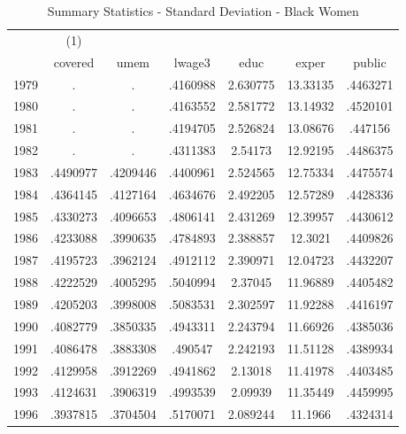 {
\def\sym#1{\ifmmode^{#1}\else\(^{#1}\)\fi}
\begin{longtable}{l*{1}{cccccc}}
\caption{Summary Statistics - Standard Deviation - Black Women}\\
\hline\hline\endfirsthead\hline\endhead\hline\endfoot\endlastfoot
            &\multicolumn{1}{c}{(1)}&            &            &            &            &            \\
            &     covered&        umem&      lwage3&        educ&       exper&      public\\
\hline
1979        &           .&           .&    .4160988&    2.630775&    13.33135&    .4463271\\
1980        &           .&           .&    .4163552&    2.581772&    13.14932&    .4520101\\
1981        &           .&           .&    .4194705&    2.526824&    13.08676&     .447156\\
1982        &           .&           .&    .4311383&     2.54173&    12.92195&    .4486375\\
1983        &    .4490977&    .4209446&    .4400961&    2.524565&    12.75334&    .4475574\\
1984        &    .4364145&    .4127164&    .4634676&    2.492205&    12.57289&    .4428336\\
1985        &    .4330273&    .4096653&    .4806141&    2.431269&    12.39957&    .4430612\\
1986        &    .4233088&    .3990635&    .4784893&    2.388857&     12.3021&    .4409826\\
1987        &    .4195723&    .3962124&    .4912112&    2.390971&    12.04723&    .4432207\\
1988        &    .4222529&    .4005295&    .5040994&     2.37045&    11.96889&    .4405482\\
1989        &    .4205203&    .3998008&    .5083531&    2.302597&    11.92288&    .4416197\\
1990        &    .4082779&    .3850335&    .4943311&    2.243794&    11.66926&    .4385036\\
1991        &    .4086478&    .3883308&     .490547&    2.242193&    11.51128&    .4389934\\
1992        &    .4129958&    .3912269&    .4941862&     2.13018&    11.41978&    .4403485\\
1993        &    .4124631&    .3906319&    .4993539&     2.09939&    11.35449&    .4459995\\
1996        &    .3937815&    .3704504&    .5170071&    2.089244&     11.1966&    .4324314\\

\end{longtable}}
